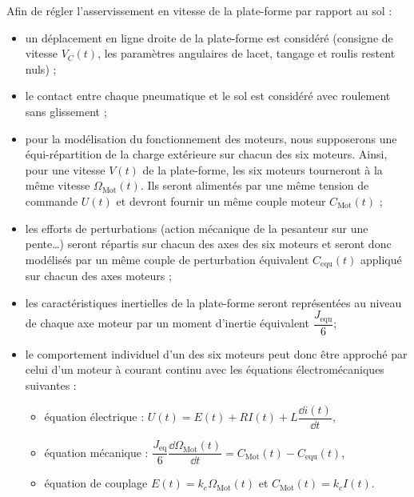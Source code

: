 \begin{hypo}
Afin de régler l'asservissement en vitesse de la plate-forme par rapport au sol :
\begin{itemize}
\item un déplacement en ligne droite de la plate-forme est considéré (consigne de vitesse $V_C(t)$, les paramètres
angulaires de lacet, tangage et roulis restent nuls) ;
\item le contact entre chaque pneumatique et le sol est considéré avec roulement sans glissement ;
\item pour la modélisation du fonctionnement des moteurs, nous supposerons une équi-répartition de la charge extérieure sur chacun des six moteurs. Ainsi, pour une vitesse $V (t)$ de la plate-forme, les six moteurs tourneront à la même vitesse $\Omega_{\text{Mot}}(t)$. Ils seront alimentés par une même tension de commande $U(t)$ et devront fournir un même couple moteur $C_{\text{Mot}}(t)$ ;
\item les efforts de perturbations (action mécanique de la pesanteur sur une pente…) seront répartis sur chacun des axes des six moteurs et seront donc modélisés par un même couple de perturbation équivalent $C_{\text{equ}}(t)$ appliqué sur chacun des axes moteurs ;
\item les caractéristiques inertielles de la plate-forme seront représentées au niveau de chaque axe moteur par un moment d'inertie équivalent $\dfrac{J_{\text{equ}}}{6}$;
\item le comportement individuel d'un des six moteurs peut donc être approché par celui d'un moteur à courant continu avec les équations électromécaniques suivantes :
\begin{itemize}
\item équation électrique : $U(t)=E(t)+RI(t)+L\dfrac{\dd i(t)}{\dd t}$,
\item équation mécanique : $\dfrac{J_{\text{eq}}}{6} \dfrac{\dd \Omega_{\text{Mot}}(t)}{\dd t} = C_{\text{Mot}}(t)-C_{\text{equ}}(t)$,
\item équation de couplage $E(t)=k_e\Omega_{\text{Mot}}(t)$ et $C_{\text{Mot}}(t) = k_c I(t)$.
\end{itemize}
\end{itemize}
\end{hypo}



